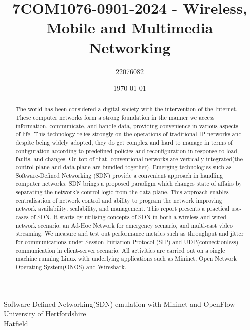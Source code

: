 \documentclass{article}
\title{7COM1076-0901-2024 - Wireless, Mobile and Multimedia Networking}
\author{22076082}
\date{\today}
\begin{document}
\maketitle
\vspace{80pt}
\begin{center}
	\huge{Software Defined Networking(SDN) emulation with Mininet and OpenFlow} \\ [100pt]
	\vspace{80pt}
	\large{University of Hertfordshire} \\
	\large{Hatfield}
\end{center}

\newpage
\tableofcontents
\newpage
\listoftables
\listoffigures

\newpage
\begin{abstract}
The world has been considered a digital society with the intervention of the Internet. These computer networks form a strong foundation in the manner we access information, communicate, and handle data, providing convenience in various aspects of life. This technology relies strongly on the operations of traditional IP networks and despite being widely adopted, they do get complex and hard to manage in terms of configuration according to predefined policies and reconfiguration in response to load, faults, and changes. On top of that, conventional networks are vertically integrated(the control plane and data plane are bundled together). Emerging technologies such as Software-Defined Networking (SDN) provide a convenient approach in handling computer networks. SDN brings a proposed paradigm which changes state of affairs by separating the network's control logic from the data plane. This approach enables centralisation of network control and ability to program the network improving network availability, scalability, and management. This report presents a practical use-cases of SDN. It starts by utilising concepts of SDN in both a wireless and wired network scenario, an Ad-Hoc Network for emergency scenario, and multi-cast video streaming. We measure and test out performance metrics such as throughput and jitter for communications under Session Initiation Protocol (SIP) and UDP(connectionless) communication in client-server scenario. All activities are carried out on a single machine running Linux with underlying applications such as Mininet, Open Network Operating System(ONOS) and Wireshark.
\end{abstract}

\newpage
\end{document}
